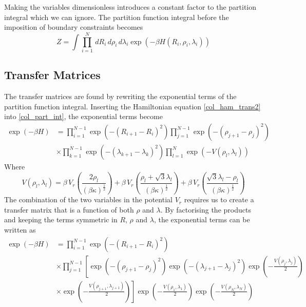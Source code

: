 %
Making the variables dimensionless introduces a constant factor to the partition integral which we can ignore. The partition function integral before the imposition of boundary constraints becomes
%
\begin{equation}\label{col_part_int}
Z=\int \prod_{i=1}^{N}\,dR_{i}\,d\rho_{i}\,d\lambda _{i}\exp\left(-\beta H\left(R_{i},\rho_{i},\lambda_{i}\right)\right)
\end{equation}
%
\subsection{Transfer Matrices}

The transfer matrices are found by rewriting the exponential terms of the partition function integral. Inserting the Hamiltonian equation \eqref{col_ham_trans2} into \eqref{col_part_int}, the exponential terms become
%
\begin{align}\label{col_hyp_expo_term1}
\exp\left(-\beta H\right)&=\prod_{i=1}^{N-1}\exp\left(-\left(R_{i+1}-R_{i}\right)^{2}\right)\prod_{j=1}^{N-1}\exp\left(-\left(\rho_{j+1}-\rho_{j}\right)^{2}\right)\nonumber\\
&\times\prod_{k=1}^{N-1}\exp\left(-\left(\lambda_{k+1}-\lambda_{k}\right)^{2}\right)\prod_{l=1}^{N}\exp\left(-V\left(\rho_{l},\lambda_{l}\right)\right)
\end{align}
%
Where
%
\begin{equation}
V\left(\rho_{l},\lambda_{l}\right)  = \beta\,V_{r}\left(\frac{2\rho_l}{\left( \beta \kappa\right)^{\frac{1}{2}}}\right)+\beta\,V_{r}\left(\frac{\rho_l+ \sqrt{3}\lambda_l}{\left( \beta \kappa\right)^{\frac{1}{2}}}\right)+\beta\,V_{r}\left(\frac{\sqrt{3}\lambda_l - \rho_l}{\left( \beta \kappa\right)^{\frac{1}{2}}}\right)
\end{equation}
%
The combination of the two variables in the potential $V_{r}$ requires us to create a transfer matrix that is a function of both $\rho$ and $\lambda$. By factorising the products and keeping the terms symmetric in $R$, $\rho$ and $\lambda$, the exponential terms can be written as 
%
\begin{equation}\label{col_hyp_expo_term2}
\begin{split}
\exp\left(-\beta H\right)&=\prod_{i=1}^{N-1}\exp\left(-\left(R_{i+1}-R_{i}\right)^{2}\right) \\
&\times\prod_{j=1}^{N-1}\left[\exp\left(-\left(\rho_{j+1}-\rho_{j}\right)^2\right)\exp\left(-\left(\lambda_{j+1}-\lambda_{j}\right)^2\right)\exp\left(-\frac{V\left(\rho_{j},\lambda_{j}\right)}{2}\right)\right. \\
&\times\left.\exp\left(-\frac{V\left(\rho_{j+1},\lambda_{j+1}\right)}{2}\right)\right]\exp\left(-\frac{V\left(\rho_{1},\lambda_{1}\right)}{2}\right)\exp\left(-\frac{V\left(\rho_{N},\lambda_{N}\right)}{2}\right)
\end{split}
\end{equation}
